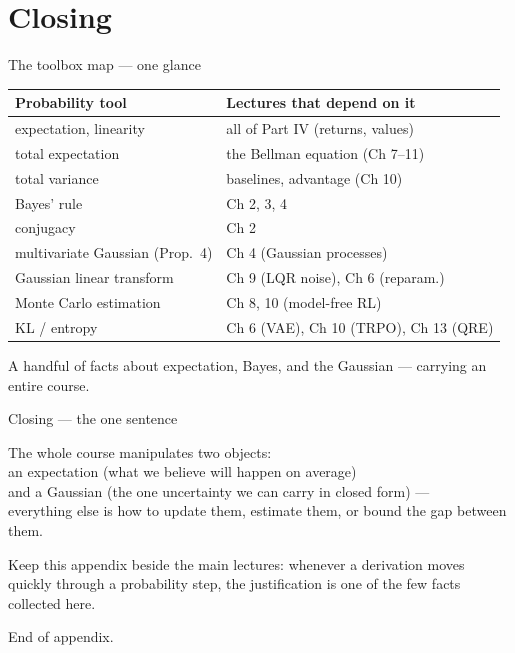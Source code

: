 \documentclass[10pt, aspectratio=169]{beamer}
\begin{document}
\section{Closing}

\begin{frame}{The toolbox map --- one glance}
\begin{center}\footnotesize\renewcommand{\arraystretch}{1.45}
\begin{tabular}{l|l}
\textbf{Probability tool} & \textbf{Lectures that depend on it} \\
\hline
expectation, linearity & all of Part IV (returns, values) \\
total expectation & the Bellman equation (Ch 7--11) \\
total variance & baselines, advantage (Ch 10) \\
Bayes' rule & Ch 2, 3, 4 \\
conjugacy & Ch 2 \\
multivariate Gaussian (Prop.\ 4) & \alert{Ch 4 (Gaussian processes)} \\
Gaussian linear transform & Ch 9 (LQR noise), Ch 6 (reparam.) \\
Monte Carlo estimation & Ch 8, 10 (model-free RL) \\
KL / entropy & Ch 6 (VAE), Ch 10 (TRPO), Ch 13 (QRE) \\
\end{tabular}
\end{center}
\medskip

\pause
\begin{center}\large
A handful of facts about \alert{expectation, Bayes, and the Gaussian} --- carrying an entire course.
\end{center}
\end{frame}

\begin{frame}{Closing --- the one sentence}
\vfill
\begin{center}\large
The whole course manipulates two objects:\\[8pt]
an \alert{expectation} (what we believe will happen on average)\\[4pt]
and a \alert{Gaussian} (the one uncertainty we can carry in closed form) ---\\[4pt]
everything else is how to update them, estimate them, or bound the gap between them.
\end{center}
\vfill
\pause
\footnotesize
Keep this appendix beside the main lectures: whenever a derivation moves quickly through a probability step, the justification is one of the few facts collected here.
\end{frame}

\begin{frame}[standout]
End of appendix.
\end{frame}
\end{document}
